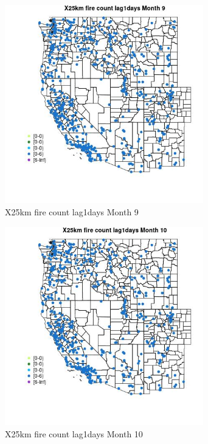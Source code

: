\begin{figure} 
\centering  
\includegraphics[width=0.77\textwidth]{Code_Outputs/Report_ML_input_PM25_Step4_part_e_de_duplicated_aves_compiled_2019-05-14wNAs_MapObsMo9X25km_fire_count_lag1days.jpg} 
\caption{\label{fig:Report_ML_input_PM25_Step4_part_e_de_duplicated_aves_compiled_2019-05-14wNAsMapObsMo9X25km_fire_count_lag1days}X25km fire count lag1days Month 9} 
\end{figure} 
 

\begin{figure} 
\centering  
\includegraphics[width=0.77\textwidth]{Code_Outputs/Report_ML_input_PM25_Step4_part_e_de_duplicated_aves_compiled_2019-05-14wNAs_MapObsMo10X25km_fire_count_lag1days.jpg} 
\caption{\label{fig:Report_ML_input_PM25_Step4_part_e_de_duplicated_aves_compiled_2019-05-14wNAsMapObsMo10X25km_fire_count_lag1days}X25km fire count lag1days Month 10} 
\end{figure} 
 

